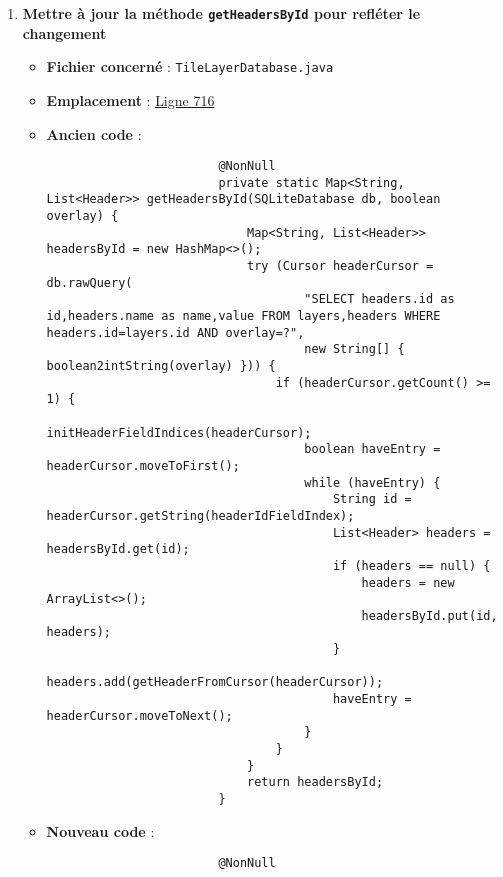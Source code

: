 \begin{enumerate}
    \item \textbf{Mettre à jour la méthode \texttt{getHeadersById} pour refléter le changement}
          \begin{itemize}
              \item \textbf{Fichier concerné} : \texttt{TileLayerDatabase.java}
              \item \textbf{Emplacement} : \href{https://github.com/MarcusWolschon/osmeditor4android/blob/dcabe8084aa15f5551a37c990516bf73398af1bf/src/main/java/de/blau/android/resources/TileLayerDatabase.java#L716}{Ligne 716}
              \item \textbf{Ancien code} :
                    \begin{verbatim}
                        @NonNull
                        private static Map<String, List<Header>> getHeadersById(SQLiteDatabase db, boolean overlay) {
                            Map<String, List<Header>> headersById = new HashMap<>();
                            try (Cursor headerCursor = db.rawQuery(
                                    "SELECT headers.id as id,headers.name as name,value FROM layers,headers WHERE headers.id=layers.id AND overlay=?",
                                    new String[] { boolean2intString(overlay) })) {
                                if (headerCursor.getCount() >= 1) {
                                    initHeaderFieldIndices(headerCursor);
                                    boolean haveEntry = headerCursor.moveToFirst();
                                    while (haveEntry) {
                                        String id = headerCursor.getString(headerIdFieldIndex);
                                        List<Header> headers = headersById.get(id);
                                        if (headers == null) {
                                            headers = new ArrayList<>();
                                            headersById.put(id, headers);
                                        }
                                        headers.add(getHeaderFromCursor(headerCursor));
                                        haveEntry = headerCursor.moveToNext();
                                    }
                                }
                            }
                            return headersById;
                        }
                    \end{verbatim}
              \item \textbf{Nouveau code} :
                    \begin{verbatim}
                        @NonNull

\end{verbatim}
\end{itemize}
\end{enumerate}
